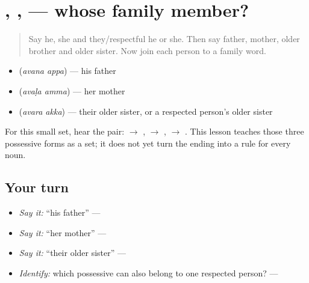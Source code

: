\section[\texorpdfstring{\kn{ಅವನ} \kn{ಅವಳ} \kn{ಅವರ} (avana avaḷa avara)}{ಅವನ ಅವಳ ಅವರ (avana avaḷa avara)}]{, ,  — whose family member?}

\label{lesson:KA-C12-third-person-possession}



\begin{quote}
Say he, she and they/respectful he or she. Then say father, mother, older brother and older sister. Now join each person to a family word.
\end{quote}

\begin{grammarlens}[title={Grammar Lens: remove the final pronoun ending}]
\begin{itemize}
\raggedright
  \item \textbf{ } (\emph{avana appa}) — his father
  \item \textbf{ } (\emph{avaḷa amma}) — her mother
  \item \textbf{ } (\emph{avara akka}) — their older sister, or a respected person's older sister
\end{itemize}

For this small set, hear the pair: \textbf{ $\to$ }, \textbf{ $\to$ }, \textbf{ $\to$ }. This lesson teaches those three possessive forms as a set; it does not yet turn the ending into a rule for every noun.
\end{grammarlens}

\subsection*{Your turn}
\begin{itemize}
\raggedright
  \item \emph{Say it:} “his father” — \textbf{ }
  \item \emph{Say it:} “her mother” — \textbf{ }
  \item \emph{Say it:} “their older sister” — \textbf{ }
  \item \emph{Identify:} which possessive can also belong to one respected person? — \textbf{}
\end{itemize}

